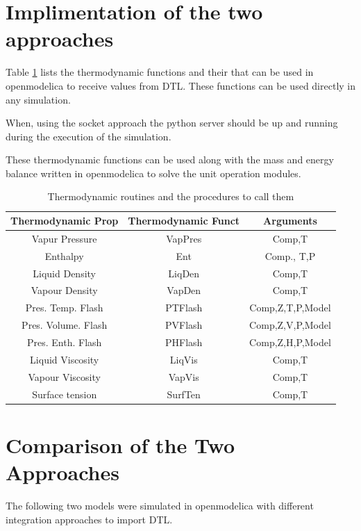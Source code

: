 \documentclass[12pt]{report}
\begin{document}
\section{Implimentation of the two approaches}
Table \ref{Prop} lists the thermodynamic functions and their that can be used in openmodelica to receive values from DTL. These functions can be used directly in any simulation. 

When, using the socket approach the python server should be up and running during the execution of the simulation. 

These thermodynamic functions can be used along with the mass and energy balance written in openmodelica to solve the unit operation modules. 

\begin{table}
\label{Prop}
\caption{Thermodynamic routines and the procedures to call them}
\centering
\begin{tabular}{|c|c|c|} \hline
Thermodynamic Prop & Thermodynamic Funct & Arguments \\ \hline
Vapur Pressure & VapPres & Comp,T \\
Enthalpy & Ent & Comp., T,P \\
Liquid Density & LiqDen & Comp,T \\
Vapour Density & VapDen & Comp,T \\
Pres. Temp. Flash & PTFlash & Comp,Z,T,P,Model \\
Pres. Volume. Flash & PVFlash & Comp,Z,V,P,Model \\
Pres. Enth. Flash & PHFlash & Comp,Z,H,P,Model \\
Liquid Viscosity & LiqVis & Comp,T \\
Vapour Viscosity & VapVis & Comp,T \\
Surface tension & SurfTen & Comp,T \\ \hline
\end{tabular}
\end{table}

\section{Comparison of the Two Approaches}
The following two models were simulated in openmodelica with different integration approaches to import DTL.
\end{document}
